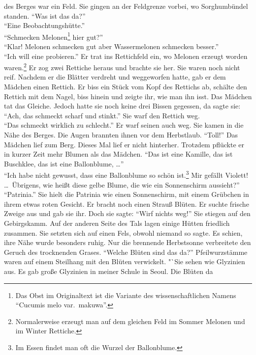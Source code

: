 \documentclass[prd,12pt,tightenlines,notitlepage,nofootinbib]{revtex4-1}
\begin{document}
des Berges war ein Feld.  Sie gingen an der Feldgrenze vorbei, wo
Sorghumbündel standen.  "`Was ist das da?"'\\
"`Eine Beobachtungshütte."'\\
"`Schmecken Melonen\footnote{
  Das Obst im Originaltext ist die Variante des wissenschaftlichen Namens
  "`Cucumis melo var.\ makuwa"'.}
hier gut?"'\\
"`Klar!  Melonen schmecken gut aber Wassermelonen schmecken besser."'\\
"`Ich will eine probieren."'  Er
trat ins Rettichfeld ein, wo Melonen erzeugt worden waren.\footnote{
Normalerweise erzeugt man auf dem gleichen Feld
im Sommer Melonen und im Winter Rettiche.}
Er zog
zwei Rettiche heraus und brachte sie her.  Sie waren noch nicht reif.
Nachdem er die Blätter verdreht und weggeworfen hatte, gab er dem Mädchen einen
Rettich.  Er biss ein Stück vom Kopf des Rettichs ab, schälte den
Rettich mit dem Nagel, biss hinein und zeigte ihr, wie man ihn
isst.  Das Mädchen tat das Gleiche.  Jedoch hatte sie noch keine drei
Bissen gegessen, da sagte sie: "`Ach, das schmeckt scharf und stinkt."'  Sie warf den
Rettich weg.
\\ "`Das schmeckt wirklich zu schlecht."'  Er warf seinen auch
weg.  Sie kamen in die Nähe des Berges.  Die Augen brannten ihnen vor dem Herbstlaub.
"`Toll!"'  Das Mädchen lief zum Berg.  Dieses Mal lief er nicht hinterher.
Trotzdem pflückte er in kurzer Zeit mehr Blumen als das Mädchen.
"`Das ist eine Kamille, das ist Buschklee, das ist eine Ballonblume, \ldots"'
\\ "`Ich habe nicht gewusst, dass eine Ballonblume so schön ist.\footnote{
Im Essen findet man oft die Wurzel der Ballonblume.}
Mir gefällt
Violett!  \ldots\  Übrigens, wie heißt diese gelbe Blume, die wie ein
Sonnenschirm aussieht?"'\\
"`Patrinia."'  Sie hielt die Patrinia wie einen
Sonnenschirm, mit einem Grübchen in ihrem etwas roten Gesicht.  Er
bracht noch einen Strauß Blüten.  Er suchte frische Zweige aus und
gab sie ihr.  Doch sie sagte: "`Wirf nichts weg!"'  Sie stiegen auf den
Gebirgskamm.  Auf der anderen Seite des Tals lagen einige Hütten
friedlich zusammen.  Sie setzten sich auf einen Fels, obwohl niemand
so sagte.  Es schien, ihre Nähe wurde besonders ruhig.  Nur die
brennende Herbstsonne verbreitete den Geruch des trocknenden Grases.
"`Welche Blüten sind das da?"'  Pfeilwurzstämme waren auf einem
Steilhang mit den Blüten verwickelt.  "`Sie sehen wie Glyzinien aus.
Es gab große Glyzinien in meiner Schule in Seoul.  Die Blüten da
\end{document}

